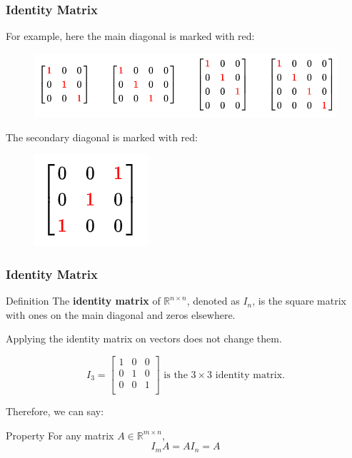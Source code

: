 \documentclass{beamer}
\newcommand{\R}{\mathbb{R}}
\begin{document}
\begin{frame}
  \frametitle{Identity Matrix}
    For example, here the main diagonal is marked with red:
\begin{figure}
    \centering
    \includegraphics[width=\linewidth]{diagonals.png}    
\end{figure}
\pause
The secondary diagonal is marked with red:
\begin{figure}
    \centering
    \includegraphics[width=0.2\linewidth]{image.png}
\end{figure}

\end{frame}



\begin{frame}
  \frametitle{Identity Matrix}


  \begin{block}{Definition}
    The \textbf{identity matrix} of $\R^{n \times n}$, denoted as \(I_n\), is the square matrix with ones on the main diagonal and zeros elsewhere.
  \end{block}

Applying the identity matrix on vectors does not change them.

  \pause

  \begin{example}
    \[
      I_3 = \begin{bmatrix}
        1 & 0 &0  \\
        0 & 1 &0\\
        0 &0& 1\\
      \end{bmatrix}
    \text{  is the $3\times 3$ identity matrix.}\]
    
  \end{example}
\pause

Therefore, we can say:
\begin{block}{Property}
    For any matrix $A\in\R^{m\times n}$,
    \[ I_m A = A I_n = A\]
\end{block}

\end{frame}
\end{document}
